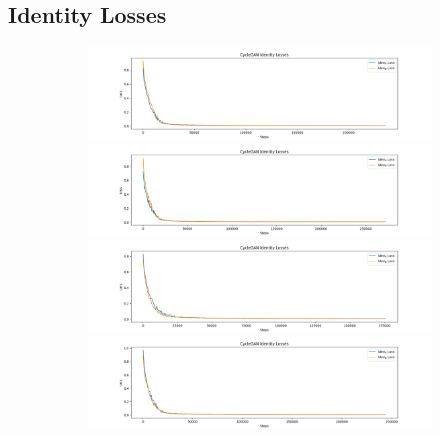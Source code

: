 \documentclass[12pt, fleqn, titlepage]{article}
\begin{document}
\subsection{Identity Losses}\label{iden_loss}
\begin{figure}[H]
	\centering
	\begin{subfigure}[b]{0.8\textwidth}
		\centering
		\includegraphics[width=\linewidth]{imgs/identity_losses/XY_model_identity_losses}
		\hfill
		\includegraphics[width=\linewidth]{imgs/identity_losses/XZ_model_identity_losses}
		\hfill
		\includegraphics[width=\linewidth]{imgs/identity_losses/YZ_model_identity_losses}
		\hfill
		\includegraphics[width=\linewidth]{imgs/identity_losses/ALL_model_identity_losses}
	\end{subfigure}
\end{figure}
\end{document}
